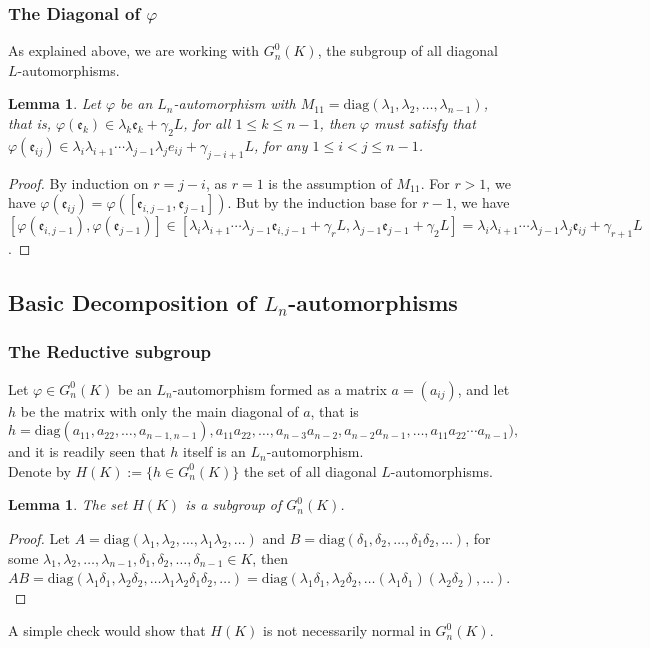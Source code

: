 \documentclass{article}
\newtheorem{lemma4}[paragraph]{Lemma}
\newcommand{\e}{\mathfrak{e}}
\begin{document}
\subsubsection{The Diagonal of $\varphi$}
As explained above, we are working with $G_n^0(K)$, the subgroup of all diagonal ${L}$-automorphisms.
\begin{lemma4}
\label{lem:automorphism-diagonal}
Let $\varphi$ be an $L_n$-automorphism with $M_{11}=\mathrm{diag}(\lambda_1,\lambda_2,\dots,\lambda_{n-1})$, that is,  $\varphi(\e_k)\in\lambda_k\e_k+\gamma_2{L}$, for all $1\leq{k}\leq{n}-1$, then $\varphi$ must satisfy that $\varphi(\e_{ij})\in\lambda_i\lambda_{i+1}\cdots\lambda_{j-1}\lambda_j{e}_{ij}+\gamma_{j-i+1}{L}$, for any $1\leq{i}<j\leq{n-1}$.
\end{lemma4}
\begin{proof}
By induction on $r=j-i$, as $r=1$ is the assumption of $M_{11}$. For $r>1$, we have $\varphi(\e_{ij})=\varphi([\e_{i,j-1},\e_{j-1}])$.
But by the induction base for $r-1$, we have
$[\varphi(\e_{i,j-1}),\varphi(\e_{j-1})]\in[\lambda_i\lambda_{i+1}\cdots\lambda_{j-1}\e_{i,j-1}+\gamma_r{L},\lambda_{j-1}\e_{j-1}+\gamma_2{L}]=\lambda_i\lambda_{i+1}\cdots\lambda_{j-1}\lambda_j\e_{ij}+\gamma_{r+1}{L}$.
\end{proof}
\subsection{Basic Decomposition of $L_n$-automorphisms}
\subsubsection{The Reductive subgroup}
Let $\varphi\in{G}_n^0(K)$ be an $L_n$-automorphism formed as a matrix $a=(a_{ij})$, and let $h$ be the matrix with only the main diagonal of $a$, that is \[h=\mathrm{diag}(a_{11},a_{22},\dots,a_{n-1,n-1}),a_{11}a_{22},\dots,a_{n-3}a_{n-2},a_{n-2}a_{n-1},\dots,a_{11}a_{22}\cdots{a}_{n-1}),\]
and it is readily seen that $h$ itself is an $L_n$-automorphism.\\
Denote by $H(K):=\{h\in{G}_n^0(K)\}$ the set of all diagonal ${L}$-automorphisms.
\begin{lemma4}
The set $H(K)$ is a subgroup of $G_n^0(K)$.
\end{lemma4}
\begin{proof}
Let $A=\mathrm{diag}(\lambda_1,\lambda_2,\dots,\lambda_1\lambda_2,\dots)$ and $B=\mathrm{diag}(\delta_1,\delta_2,\dots,\delta_1\delta_2,\dots)$, for some $\lambda_1,\lambda_2,\dots,\lambda_{n-1},\delta_1,\delta_2,\dots,\delta_{n-1}\in{K}$, then $AB=\mathrm{diag}(\lambda_1\delta_1,\lambda_2\delta_2,\dots\lambda_1\lambda_2\delta_1\delta_2,\dots)=\mathrm{diag}(\lambda_1\delta_1,\lambda_2\delta_2,\dots(\lambda_1\delta_1)(\lambda_2\delta_2),\dots).$
\end{proof}
A simple check would show that $H(K)$ is not necessarily normal in $G_n^0(K)$.
\end{document}
